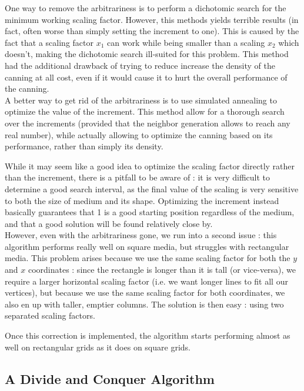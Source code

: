 \documentclass{report}
\begin{document}
One way to remove the arbitrariness is to perform a dichotomic search for the minimum working scaling factor. However, this methods yields terrible results (in fact, often worse than simply setting the increment to one). This is caused by the fact that a scaling factor $x_1$ can work while being smaller than a scaling $x_2$ which doesn't, making the dichotomic search ill-suited for this problem. This method had the additional drawback of trying to reduce increase the density of the canning at all cost, even if it would cause it to hurt the overall performance of the canning.\\

A better way to get rid of the arbitrariness is to use simulated annealing to optimize the value of the increment. This method allow for a thorough search over the increments (provided that the neighbor generation allows to reach any real number), while actually allowing to optimize the canning based on its performance, rather than simply its density.

While it may seem like a good idea to optimize the scaling factor directly rather than the increment, there is a pitfall to be aware of : it is very difficult to determine a good search interval, as the final value of the scaling is very sensitive to both the size of medium and its shape. Optimizing the increment instead basically guarantees that 1 is a good starting position regardless of the medium, and that a good solution will be found relatively close by.\\

However, even with the arbitrariness gone, we run into a second issue : this algorithm performs really well on square media, but struggles with rectangular media. This problem arises because we use the same scaling factor for both the $y$ and $x$ coordinates : since the rectangle is longer than it is tall (or vice-versa), we require a larger horizontal scaling factor (i.e. we want longer lines to fit all our vertices), but because we use the same scaling factor for both coordinates, we also en up with taller, emptier columns. The solution is then easy : using two separated scaling factors.

Once this correction is implemented, the algorithm starts performing almost as well on rectangular grids as it does on square grids.

\subsection{A Divide and Conquer Algorithm}
\end{document}
